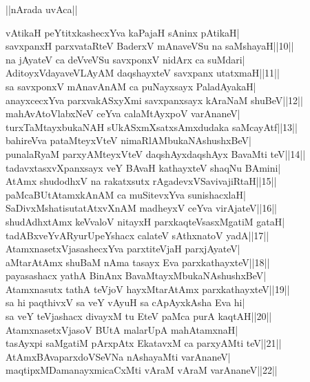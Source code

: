 \documentclass{article}
\begin{document}
\begin{center}
||nArada uvAca||
\end{center}

vAtikaH peYtitxkashecxYva kaPajaH sAninx pAtikaH|\\
savxpanxH parxvataRteV BaderxV mAnaveVSu na saMshayaH||10||\\
na jAyateV ca deVveVSu savxponxV nidArx ca suMdari|\\
AditoyxVdayaveVLAyAM daqshayxteV savxpanx utatxmaH||11||\\
sa savxponxV mAnavAnAM ca puNayxsayx PaladAyakaH|\\
anayxcecxYva parxvakASxyXmi savxpanxsayx kAraNaM shuBeV||12||\\
mahAvAtoVlabxNeV ceYva calaMtAyxpoV varAnaneV|\\
turxTaMtayxbukaNAH sUkASxmXsatxsAmxdudaka saMcayAtf||13||\\
bahireVva pataMteyxVteV nimaRlAMbukaNAshushxBeV|\\
punalaRyaM parxyAMteyxVteV daqshAyxdaqshAyx BavaMti teV||14||\\
tadavxtasxvXpanxsayx veY BAvaH kathayxteV shaqNu BAmini|\\
AtAmx shudodhxV na rakatxsutx rAgadevxVSavivajiRtaH||15||\\
paMcaBUtAtamxkAnAM ca muSitevxYva sunishacxlaH|\\
SaDivxMshatisutatAtxvXnAM madheyxV ceYva virAjateV||16||\\
shudAdhxtAmx keVvaloV nitayxH parxkaqteVsasxMgatiM gataH|\\
tadABxveYvARyurUpeYshacx calateV sAthxnatoV yadA||17||\\
AtamxnasetxVjasashecxYva parxtiteVjaH parxjAyateV|\\
aMtarAtAmx shuBaM nAma tasayx Eva parxkathayxteV||18||\\
payasashacx yathA BinAnx BavaMtayxMbukaNAshushxBeV|\\
Atamxnasutx tathA teVjoV hayxMtarAtAmx parxkathayxteV||19||\\
sa hi paqthivxV sa veY vAyuH sa cApAyxkAsha Eva hi|\\
sa veY teVjashacx divayxM tu EteV paMca purA kaqtAH||20||\\
AtamxnasetxVjasoV BUtA malarUpA mahAtamxnaH|\\
tasAyxpi saMgatiM pArxpAtx EkatavxM ca parxyAMti teV||21||\\
AtAmxBAvaparxdoVSeVNa nAshayaMti varAnaneV|\\
maqtipxMDamanayxmicaCxMti vAraM vAraM varAnaneV||22||\\
\end{document}
